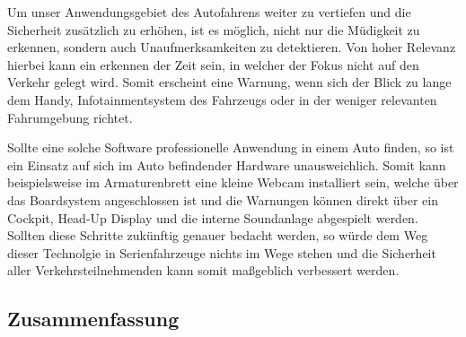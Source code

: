 Um unser Anwendungsgebiet des Autofahrens weiter zu vertiefen und die Sicherheit zusätzlich zu erhöhen, ist es möglich, nicht nur die Müdigkeit zu erkennen, sondern auch Unaufmerksamkeiten zu detektieren. Von hoher Relevanz hierbei kann ein erkennen der Zeit sein, in welcher der Fokus nicht auf den Verkehr gelegt wird. Somit erscheint eine Warnung, wenn sich der Blick zu lange dem Handy, Infotainmentsystem des Fahrzeugs oder in der weniger relevanten Fahrumgebung richtet.

Sollte eine solche Software professionelle Anwendung in einem Auto finden, so ist ein Einsatz auf sich im Auto befindender Hardware unausweichlich. Somit kann beispielsweise im Armaturenbrett eine kleine Webcam installiert sein, welche über das Boardsystem angeschlossen ist und die Warnungen können direkt über ein Cockpit, Head-Up Display und die interne Soundanlage abgespielt werden. Sollten diese Schritte zukünftig genauer bedacht werden, so würde dem Weg dieser Technolgie in Serienfahrzeuge nichts im Wege stehen und die Sicherheit aller Verkehrsteilnehmenden kann somit maßgeblich verbessert werden.






\subsection{Zusammenfassung}
